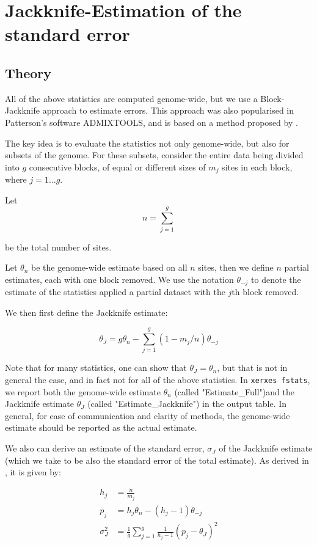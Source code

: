\documentclass{article}
\begin{document}
\section{Jackknife-Estimation of the standard error}

\subsection{Theory}
All of the above statistics are computed genome-wide, but we use a Block-Jackknife approach to estimate errors. This approach was also popularised in Patterson's software ADMIXTOOLS, and is based on a method proposed by \cite{Busing1999-ev}.

The key idea is to evaluate the statistics not only genome-wide, but also for subsets of the genome. For these subsets, consider the entire data being divided into $g$ consecutive blocks, of equal or different sizes of $m_j$ sites in each block, where $j=1\ldots g$.

Let 
$$n = \sum_{j=1}^g$$

be the total number of sites.

Let $\theta_n$ be the genome-wide estimate based on all $n$ sites, then we define $n$ partial estimates, each with one block removed. We use the notation $\theta_{-j}$ to denote the estimate of the statistics applied a partial dataset with the $j$th block removed.

We then first define the Jackknife estimate:

$$\theta_J = g \theta_n - \sum_{j=1}^g (1 - m_j / n) \theta_{-j}$$

Note that for many statistics, one can show that $\theta_J=\theta_n$, but that is not in general the case, and in fact not for all of the above statistics. In \texttt{xerxes fstats}, we report both the genome-wide estimate $\theta_n$ (called "Estimate\_Full")and the Jackknife estimate $\theta_J$ (called "Estimate\_Jackknife") in the output table. In general, for ease of communication and clarity of methods, the genome-wide estimate should be reported as the actual estimate.

We also can derive an estimate of the standard error, $\sigma_J$ of the Jackknife estimate (which we take to be also the standard error of the total estimate). As derived in \cite{Busing1999-ev}, it is given by:

\begin{equation}
\begin{split}
h_j &= \frac{n}{m_j}\\
p_j &= h_j \theta_n - (h_j - 1) \theta_{-j}\\
\sigma_J^2 &= \frac{1}{g} \sum_{j=1}^g \frac{1}{h_j - 1} (p_j - \theta_J)^2
\end{split}
\end{equation}
\end{document}
